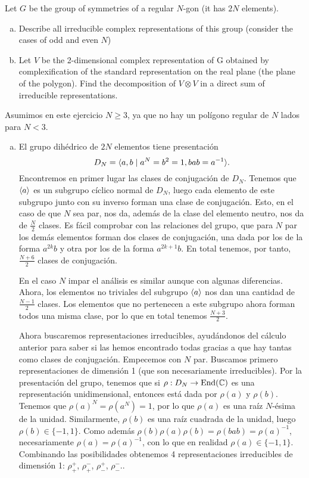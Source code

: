 \documentclass[twoside]{article}
\begin{document}
\newpage
\begin{ejercicio}{3.17}
Let $G$ be the group of symmetries of a regular $N$-gon (it has $2N$ elements).
\begin{enumerate}[(a)]
\item Describe all irreducible complex representations of this group (consider the cases of odd and even $N$)
\item Let $V$ be the 2-dimensional complex representation of G obtained by complexification of the standard representation on the real plane (the plane of the polygon). Find the decomposition of $V ⊗ V$ in a direct sum of irreducible representations.
\end{enumerate}
\end{ejercicio}
\begin{solucion}
Asumimos en este ejercicio $N\geq 3$, ya que no hay un polígono regular de $N$ lados para $N<3$. 
\begin{enumerate}[(a)]
\item El grupo dihédrico de $2N$ elementos tiene presentación $$D_N=\langle{a,b\mid a^N=b^2=1, bab=a^{-1}}\rangle.$$ Encontremos en primer lugar las clases de conjugación de $D_N$. Tenemos que $\langle{a}\rangle$ es un subgrupo cíclico normal de $D_N$, luego cada elemento de este subgrupo junto con su inverso forman una clase de conjugación. Esto, en el caso de que $N$ sea par, nos da, además de la clase del elemento neutro, nos da de $\frac{N}{2}$ clases. Es fácil comprobar con las relaciones del grupo, que para $N$ par los demás elementos forman dos clases de conjugación, una dada por los de la forma $a^{2k}b$ y otra por los de la forma $a^{2k+1}b$. En total tenemos, por tanto, $\frac{N+6}{2}$ clases de conjugación.

En el caso $N$ impar el análisis es similar aunque con algunas diferencias. Ahora, los elementos no triviales del subgrupo $\langle{a}\rangle$ nos dan una cantidad de $\frac{N-1}{2}$ clases. Los elementos que no pertenecen a este subgrupo ahora forman todos una misma clase, por lo que en total tenemos $\frac{N+3}{2}$.


Ahora buscaremos representaciones irreducibles, ayudándonos del cálculo anterior para saber si las hemos encontrado todas gracias a que hay tantas como clases de conjugación. Empecemos con $N$ par. Buscamos primero representaciones de dimensión 1 (que son necesariamente irreducibles). Por la presentación del grupo, tenemos que si $\rho: D_N\to\operatorname{End}(\mathbb{C})$ es una representación unidimensional, entonces está dada por $\rho(a)$ y $\rho(b)$. Tenemos que $\rho(a)^N=\rho(a^N)=1$, por lo que $\rho(a)$ es una raíz $N$-ésima de la unidad. Similarmente, $\rho(b)$ es una raíz cuadrada de la unidad, luego $\rho(b)\in\{-1,1\}$. Como además $\rho(b)\rho(a)\rho(b)=\rho(bab)=\rho(a)^{-1}$, necesariamente $\rho(a)=\rho(a)^{-1}$, con lo que en realidad $\rho(a)\in\{-1,1\}$. Combinando las posibilidades obtenemos 4 representaciones irreducibles de dimensión 1: $\rho_+^+$, $\rho_+^-$, $\rho_-^+$, $\rho_-^-$.. 


\end{enumerate}
\end{solucion}
\end{document}
